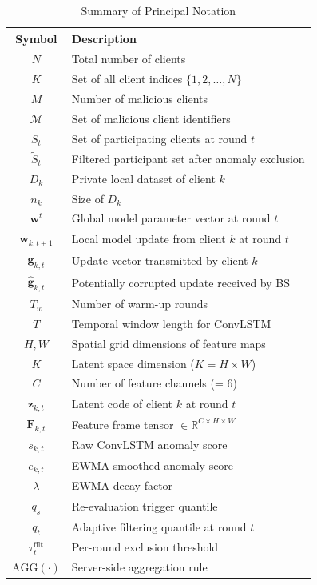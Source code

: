\documentclass[journal]{IEEEtran}
\begin{document}
\begin{table}[t]
\centering
\caption{Summary of Principal Notation}
\label{tab:notation}
\begin{tabular}{@{}cl@{}}
\toprule
\textbf{Symbol} & \textbf{Description} \\
\midrule
$N$ & Total number of clients \\
$K$ & Set of all client indices $\{1, 2, \ldots, N\}$ \\
$M$ & Number of malicious clients \\
$\mathcal{M}$ & Set of malicious client identifiers \\
$S_t$ & Set of participating clients at round $t$ \\
$\tilde{S}_t$ & Filtered participant set after anomaly exclusion \\
$D_k$ & Private local dataset of client $k$ \\
$n_k$ & Size of $D_k$ \\
$\mathbf{w}^t$ & Global model parameter vector at round $t$ \\
$\mathbf{w}_{k,t+1}$ & Local model update from client $k$ at round $t$ \\
$\mathbf{g}_{k,t}$ & Update vector transmitted by client $k$ \\
$\hat{\mathbf{g}}_{k,t}$ & Potentially corrupted update received by BS \\
$T_w$ & Number of warm-up rounds \\
$T$ & Temporal window length for ConvLSTM \\
$H, W$ & Spatial grid dimensions of feature maps \\
$K$ & Latent space dimension ($K = H \times W$) \\
$C$ & Number of feature channels (= 6) \\
$\mathbf{z}_{k,t}$ & Latent code of client $k$ at round $t$ \\
$\mathbf{F}_{k,t}$ & Feature frame tensor $\in \mathbb{R}^{C \times H \times W}$ \\
$s_{k,t}$ & Raw ConvLSTM anomaly score \\
$e_{k,t}$ & EWMA-smoothed anomaly score \\
$\lambda$ & EWMA decay factor \\
$q_s$ & Re-evaluation trigger quantile \\
$q_t$ & Adaptive filtering quantile at round $t$ \\
$\tau_t^{\text{filt}}$ & Per-round exclusion threshold \\
$\text{AGG}(\cdot)$ & Server-side aggregation rule \\
\bottomrule
\end{tabular}
\end{table}
\end{document}
